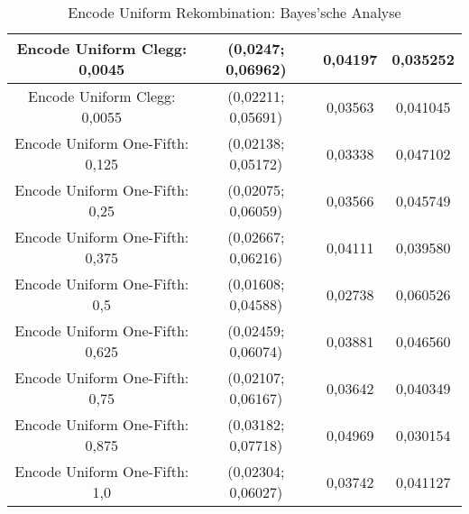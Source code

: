 \begin{table}[H]
\begin{tabular}{c | c | c | c}
		\hline
		Encode Uniform Clegg: 0,0045 & (0,0247; 0,06962) & 0,04197 & 0,035252\\
		\hline
		Encode Uniform Clegg: 0,0055 & (0,02211; 0,05691) & 0,03563 & 0,041045\\
		\hline
		Encode Uniform One-Fifth: 0,125 & (0,02138; 0,05172) & 0,03338 & 0,047102\\
		\hline
		Encode Uniform One-Fifth: 0,25 & (0,02075; 0,06059) & 0,03566 & 0,045749\\
		\hline
		Encode Uniform One-Fifth: 0,375 & (0,02667; 0,06216) & 0,04111 & 0,039580\\
		\hline
		Encode Uniform One-Fifth: 0,5 & (0,01608; 0,04588) & 0,02738 & 0,060526\\
		\hline
		Encode Uniform One-Fifth: 0,625 & (0,02459; 0,06074) & 0,03881 & 0,046560\\
		\hline
		Encode Uniform One-Fifth: 0,75 & (0,02107; 0,06167) & 0,03642 & 0,040349\\
		\hline
		Encode Uniform One-Fifth: 0,875 & (0,03182; 0,07718) & 0,04969 & 0,030154\\
		\hline
		Encode Uniform One-Fifth: 1,0 & (0,02304; 0,06027) & 0,03742 & 0,041127\\
	\end{tabular}
	\label{table:encodeUniformBayesian}
	\caption{Encode Uniform Rekombination: Bayes'sche Analyse}
\end{table}



